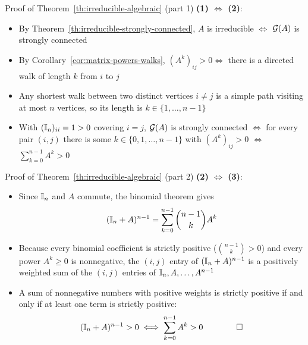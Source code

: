 \documentclass[aspectratio=169]{beamer}\usepackage[]{graphicx}\usepackage[]{xcolor}
\begin{document}
\begin{frame}{Proof of Theorem~\ref{th:irreducible-algebraic} (part 1)}
\textbf{(1) $\iff$ (2)}:
\begin{itemize}
\item By Theorem~\ref{th:irreducible-strongly-connected}, $A$ is irreducible $\iff$ $\mathcal{G}(A)$ is strongly connected
\item By Corollary~\ref{cor:matrix-powers-walks}, $(A^k)_{ij} > 0 \iff$ there is a directed walk of length $k$ from $i$ to $j$
\item Any shortest walk between two distinct vertices $i \neq j$ is a simple path visiting at most $n$ vertices, so its length is $k \in \{1, \ldots, n-1\}$
\item With $(\mathbb{I}_n)_{ii} = 1 > 0$ covering $i = j$, $\mathcal{G}(A)$ is strongly connected $\iff$ for every pair $(i, j)$ there is some $k \in \{0, 1, \ldots, n-1\}$ with $(A^k)_{ij} > 0$ $\iff$ $\sum_{k=0}^{n-1} A^k > 0$
\end{itemize}
\end{frame}

\begin{frame}{Proof of Theorem~\ref{th:irreducible-algebraic} (part 2)}
\textbf{(2) $\iff$ (3)}:
\begin{itemize}
\item Since $\mathbb{I}_n$ and $A$ commute, the binomial theorem gives
\[
(\mathbb{I}_n + A)^{n-1} = \sum_{k=0}^{n-1} \binom{n-1}{k} A^k
\]
\item Because every binomial coefficient is strictly positive ($\binom{n-1}{k} > 0$) and every power $A^k \ge 0$ is nonnegative, the $(i, j)$ entry of $(\mathbb{I}_n + A)^{n-1}$ is a positively weighted sum of the $(i, j)$ entries of $\mathbb{I}_n, A, \ldots, A^{n-1}$
\item A sum of nonnegative numbers with positive weights is strictly positive if and only if at least one term is strictly positive:
\[
(\mathbb{I}_n + A)^{n-1} > 0 \iff \sum_{k=0}^{n-1} A^k > 0 \qquad \qed
\]
\end{itemize}
\end{frame}
\end{document}
